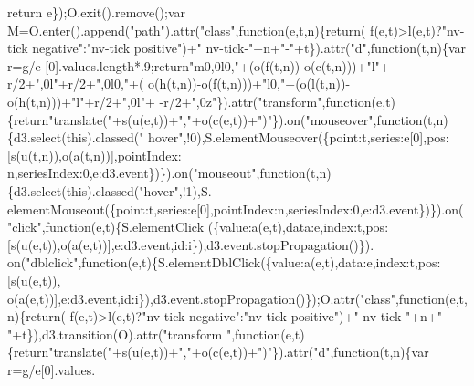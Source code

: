 \begin{DoxyCode}
{      return} e\});O.exit().remove();var M=O.enter().append(\textcolor{stringliteral}{"path"}).attr(\textcolor{stringliteral}{"class"},\textcolor{keyword}{function}(e,t,n)\{\textcolor{keywordflow}{return}(
      f(e,t)>l(e,t)?\textcolor{stringliteral}{"nv-tick negative"}:\textcolor{stringliteral}{"nv-tick positive"})+\textcolor{stringliteral}{" nv-tick-"}+n+\textcolor{stringliteral}{"-"}+t\}).attr(\textcolor{stringliteral}{"d"},\textcolor{keyword}{function}(t,n)\{var r=g/e
      [0].values.length*.9;\textcolor{keywordflow}{return}\textcolor{stringliteral}{"m0,0l0,"}+(o(f(t,n))-o(c(t,n)))+\textcolor{stringliteral}{"l"}+ -r/2+\textcolor{stringliteral}{",0l"}+r/2+\textcolor{stringliteral}{",0l0,"}+(
      o(h(t,n))-o(f(t,n)))+\textcolor{stringliteral}{"l0,"}+(o(l(t,n))-o(h(t,n)))+\textcolor{stringliteral}{"l"}+r/2+\textcolor{stringliteral}{",0l"}+ -r/2+\textcolor{stringliteral}{",0z"}\}).attr(\textcolor{stringliteral}{"transform"},\textcolor{keyword}{function}(e,t)
      \{\textcolor{keywordflow}{return}\textcolor{stringliteral}{"translate("}+s(u(e,t))+\textcolor{stringliteral}{","}+o(c(e,t))+\textcolor{stringliteral}{")"}\}).on(\textcolor{stringliteral}{"mouseover"},\textcolor{keyword}{function}(t,n)\{d3.select(\textcolor{keyword}{this}).classed(\textcolor{stringliteral}{"
      hover"},!0),S.elementMouseover(\{point:t,series:e[0],pos:[s(u(t,n)),o(a(t,n))],pointIndex:
      n,seriesIndex:0,e:d3.event\})\}).on(\textcolor{stringliteral}{"mouseout"},\textcolor{keyword}{function}(t,n)\{d3.select(\textcolor{keyword}{this}).classed(\textcolor{stringliteral}{"hover"},!1),S.
      elementMouseout(\{point:t,series:e[0],pointIndex:n,seriesIndex:0,e:d3.event\})\}).on(\textcolor{stringliteral}{"click"},\textcolor{keyword}{function}(e,t)\{S.elementClick
      (\{value:a(e,t),data:e,index:t,pos:[s(u(e,t)),o(a(e,t))],e:d3.event,\textcolor{keywordtype}{id}:i\}),d3.event.stopPropagation()\}).
      on(\textcolor{stringliteral}{"dblclick"},\textcolor{keyword}{function}(e,t)\{S.elementDblClick(\{value:a(e,t),data:e,index:t,pos:[s(u(e,t)),
      o(a(e,t))],e:d3.event,\textcolor{keywordtype}{id}:i\}),d3.event.stopPropagation()\});O.attr(\textcolor{stringliteral}{"class"},\textcolor{keyword}{function}(e,t,n)\{\textcolor{keywordflow}{return}(
      f(e,t)>l(e,t)?\textcolor{stringliteral}{"nv-tick negative"}:\textcolor{stringliteral}{"nv-tick positive"})+\textcolor{stringliteral}{" nv-tick-"}+n+\textcolor{stringliteral}{"-"}+t\}),d3.transition(O).attr(\textcolor{stringliteral}{"transform
      "},\textcolor{keyword}{function}(e,t)\{\textcolor{keywordflow}{return}\textcolor{stringliteral}{"translate("}+s(u(e,t))+\textcolor{stringliteral}{","}+o(c(e,t))+\textcolor{stringliteral}{")"}\}).attr(\textcolor{stringliteral}{"d"},\textcolor{keyword}{function}(t,n)\{var r=g/e[0].values.

\end{DoxyCode}
